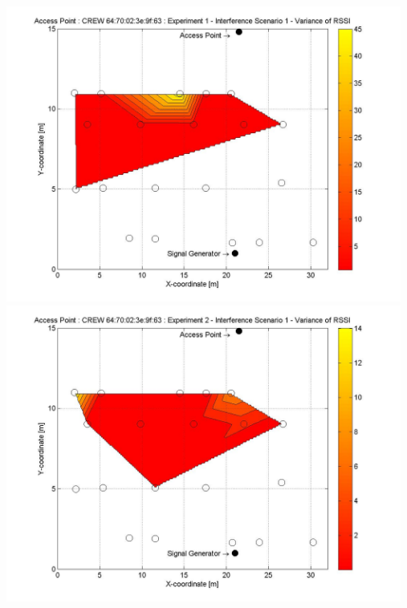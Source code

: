 \documentclass[11pt,a4paper,headinclude,footinclude,chapterprefix=on]{scrreprt}
\begin{document}
\begin{longtable}
	\includegraphics[width=13cm]{../../Source/plot/CREW_63/63_Sig_Ex_1_Variance.jpg} \\
	\includegraphics[width=13cm]{../../Source/plot/CREW_63/63_Sig_Ex_2_Variance.jpg} \\
\end{longtable}
\end{document}
